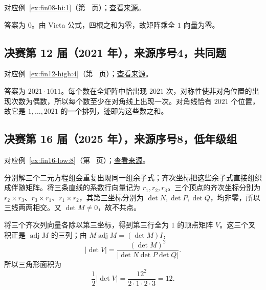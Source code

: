 \documentclass[12pt,fontset=fandol]{ctexart}
\begin{document}
对应例~\ref{ex:fin08-hi:1}（第~\pageref{ex:fin08-hi:1} 页）；\href{https://github.com/lzxcr/cmc-mathematics/blob/64916fa1fdbc3e444a652eca204d5669058ee321/src/problems/finals/08/01.md}{查看来源}。

\begin{solve}

答案为 $0$。由 Vieta 公式，四根之和为零，故矩阵乘全 $1$ 向量为零。

\end{solve}

\subsection{决赛第 12 届（2021 年），来源序号4，共同题}\label{ans:fin12-high:4}\label{pr:fin12-high:4}

对应例~\ref{ex:fin12-high:4}（第~\pageref{ex:fin12-high:4} 页）；\href{https://github.com/lzxcr/cmc-mathematics/blob/64916fa1fdbc3e444a652eca204d5669058ee321/src/problems/finals/12/04.md}{查看来源}。

\begin{solve}

答案为 $2021\cdot1011$。每个数在全矩阵中恰出现 $2021$ 次，对称性使非对角位置的出现次数为偶数，所以每个数至少在对角线上出现一次。对角线恰有 $2021$ 个位置，故它是 $1,\ldots,2021$ 的一个排列，迹即为这些数之和。

\end{solve}

\subsection{决赛第 16 届（2025 年），来源序号8，低年级组}\label{ans:fin16-low:8}\label{pr:fin16-low:8}

对应例~\ref{ex:fin16-low:8}（第~\pageref{ex:fin16-low:8} 页）；\href{https://github.com/lzxcr/cmc-mathematics/blob/64916fa1fdbc3e444a652eca204d5669058ee321/src/problems/finals/16/08.md}{查看来源}。

\begin{solve}

分别解三个二元方程组会重复出现同一组余子式；齐次坐标把这些余子式直接组织成伴随矩阵。将三条直线的系数行向量记为 $r_1,r_2,r_3$。三个顶点的齐次坐标分别为 $r_2\times r_3$、$r_3\times r_1$、$r_1\times r_2$，其第三坐标分别为 $\det N,\det P,\det Q$，均非零，所以三线两两相交。又 $\det M\ne0$，故不共点。

将三个齐次列向量各除以第三坐标，得到第三行全为 $1$ 的顶点矩阵 $V$。这三个叉积正是 $\operatorname{adj}M$ 的三列；由 $M\operatorname{adj}M=(\det M)I$，
\[
|\det V|=\frac{(\det M)^2}{|\det N\det P\det Q|}.
\]
所以三角形面积为
\[
\boxed{\frac12|\det V|=\frac{12^2}{2\cdot1\cdot2\cdot3}=12}.
\]

\end{solve}
\end{document}
